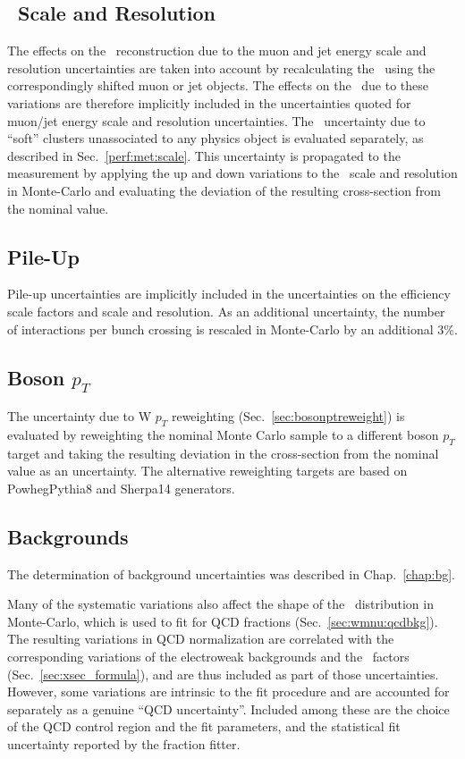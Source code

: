 \subsection{\MET\ Scale and Resolution}
The effects on the \MET\ reconstruction due to the muon and jet energy scale and resolution uncertainties are taken into account by recalculating the \MET\ using the correspondingly shifted muon or jet objects. The effects on the \MET\ due to these variations are therefore implicitly included in the uncertainties quoted for muon/jet energy scale and resolution uncertainties. The \MET\ uncertainty due to ``soft'' clusters unassociated to any physics object is evaluated separately, as described in Sec.~\ref{perf:met:scale}. This uncertainty is propagated to the measurement by applying the up and down variations to the \MET\ scale and resolution in Monte-Carlo and evaluating the deviation of the resulting cross-section from the nominal value.

\subsection{Pile-Up}
Pile-up uncertainties are implicitly included in the uncertainties on the efficiency scale factors and \met scale and resolution. As an additional uncertainty, the number of interactions per bunch crossing is rescaled in Monte-Carlo by an additional 3\%.

\subsection{Boson $p_T$}
The uncertainty due to W $p_T$ reweighting (Sec.~\ref{sec:bosonptreweight}) is evaluated by reweighting the nominal Monte Carlo sample to a different boson $p_T$ target and taking the resulting deviation in the cross-section from the nominal value as an uncertainty. The alternative reweighting targets are based on PowhegPythia8 and Sherpa14 generators.

\subsection{Backgrounds}
The determination of background uncertainties was described in Chap.~\ref{chap:bg}.

Many of the systematic variations also affect the shape of the \met\ distribution in Monte-Carlo, which is used to fit for QCD fractions (Sec.~\ref{sec:wmnu:qcdbkg}). The resulting variations in QCD normalization are correlated with the corresponding variations of the electroweak backgrounds and the \C\ factors (Sec.~\ref{sec:xsec_formula}), and are thus included as part of those uncertainties. However, some variations are intrinsic to the fit procedure and are accounted for separately as a genuine ``QCD uncertainty''. Included among these are the choice of the QCD control region and the fit parameters, and the statistical fit uncertainty reported by the fraction fitter.


